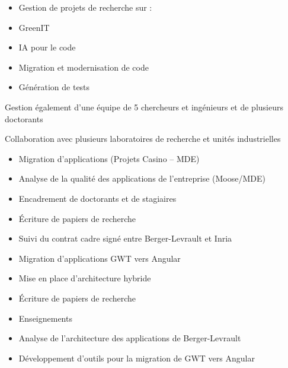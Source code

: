 \documentclass[10pt,a4paper,ragged2e,withhyper]{altacv}
\begin{document}
\begin{paracol}{2}



\begin{itemize}
\item Gestion de projets de recherche sur :
\item GreenIT
\item IA pour le code
\item Migration et modernisation de code
\item Génération de tests
\end{itemize}

Gestion également d'une équipe de 5 chercheurs et ingénieurs et de plusieurs doctorants

Collaboration avec plusieurs laboratoires de recherche et unités industrielles


\divider

\begin{itemize}
  \item Migration d'applications (Projets Casino -- MDE)
  \item Analyse de la qualité des applications de l'entreprise (Moose/MDE)
  \item Encadrement de doctorants et de stagiaires
  \item Écriture de papiers de recherche
  \item Suivi du contrat cadre signé entre Berger-Levrault et Inria
\end{itemize}

\divider

\begin{itemize}
  \item Migration d'applications GWT vers Angular
  \item Mise en place d'architecture hybride
  \item Écriture de papiers de recherche
  \item Enseignements
\end{itemize}

\divider

\begin{itemize}
  \item Analyse de l’architecture des applications de Berger-Levrault
  \item Développement d'outils pour la migration de GWT vers Angular
\end{itemize}


\end{paracol}
\end{document}
